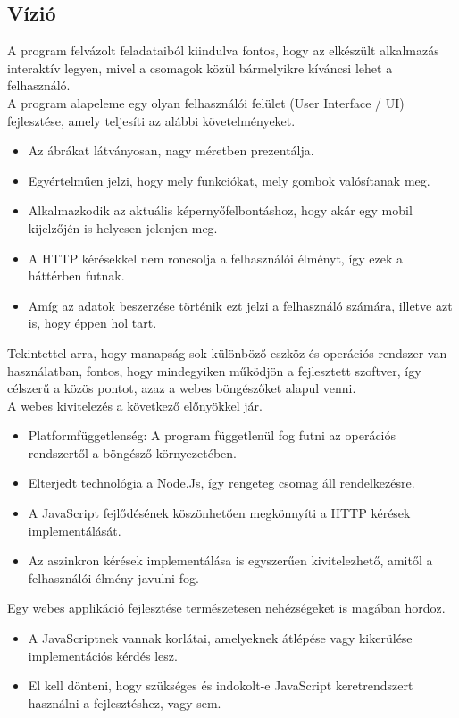 \pagebreak

	\subsection{Vízió}
	
	A program felvázolt feladataiból kiindulva fontos, hogy az elkészült alkalmazás interaktív legyen, mivel a csomagok közül bármelyikre kíváncsi lehet a felhasználó.\\
	
	A program alapeleme egy olyan felhasználói felület (User Interface / UI) fejlesztése, amely teljesíti az alábbi követelményeket. 
	
	\begin{itemize}
		\item Az ábrákat látványosan, nagy méretben prezentálja.
		\item Egyértelműen jelzi, hogy mely funkciókat, mely gombok valósítanak meg.
		\item Alkalmazkodik az aktuális képernyőfelbontáshoz, hogy akár egy mobil kijelzőjén is helyesen jelenjen meg.
		\item A HTTP kérésekkel nem roncsolja a felhasználói élményt, így ezek a háttérben futnak.
		\item Amíg az adatok beszerzése történik ezt jelzi a felhasználó számára, illetve azt is, hogy éppen hol tart.
	\end{itemize}
	
	Tekintettel arra, hogy manapság sok különböző eszköz és operációs rendszer van használatban, fontos, hogy mindegyiken működjön a fejlesztett szoftver, így célszerű a közös pontot, azaz a webes böngészőket alapul venni.\\
	 
	\noindent A webes kivitelezés a következő előnyökkel jár.
	\begin{itemize}
		\item Platformfüggetlenség: A program függetlenül fog futni az operációs rendszertől a böngésző környezetében.
		\item Elterjedt technológia a Node.Js, így rengeteg csomag áll rendelkezésre.
		\item A JavaScript fejlődésének köszönhetően megkönnyíti a HTTP kérések implementálását.
		\item Az aszinkron kérések implementálása is egyszerűen kivitelezhető, amitől a felhasználói élmény javulni fog. 
	\end{itemize}
	
	\noindent Egy webes applikáció fejlesztése természetesen nehézségeket is magában hordoz.
	\begin{itemize}
		\item A JavaScriptnek vannak korlátai, amelyeknek átlépése vagy kikerülése implementációs kérdés lesz.
		\item El kell dönteni, hogy szükséges és indokolt-e JavaScript keretrendszert használni a fejlesztéshez, vagy sem.
	\end{itemize}
	
